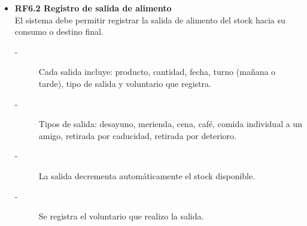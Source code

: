 \begin{itemize}
\begin{itemize}
\begin{description}
        \end{description}
        \item \textbf{RF6.1.3 Datos específicos de seguridad alimentaria} \\
        Para todo producto perecedero o susceptible de control sanitario:
        \begin{description}
            \item[-] Lote del fabricante, cuando esté disponible.
            \item[-] Fecha de caducidad o consumo preferente.
            \item[-] Para productos refrigerados: temperatura de recepción.
            \item[-] Check\footnote{Se refiere a una verificación física, y se marca con un \textit{check} que el estado del producto es aceptable.} de verificación de higiene y estado del producto al recibirse.
            \item[-] Lugar y método de almacenamiento.
        \end{description}
    \end{itemize}

    \item \textbf{RF6.2 Registro de salida de alimento} \\
    El sistema debe permitir registrar la salida de alimento del stock
    hacia su consumo o destino final.
    \begin{description}
        \item[-] Cada salida incluye: producto, cantidad, fecha, turno (mañana o tarde), tipo de salida y voluntario que registra.
        \item[-] Tipos de salida: desayuno, merienda, cena, café, comida individual a un amigo, retirada por caducidad, retirada por deterioro.
        \item[-] La salida decrementa automáticamente el stock disponible.
        \item[-] Se registra el voluntario que realizo la salida.
    \end{description}


\end{itemize}
